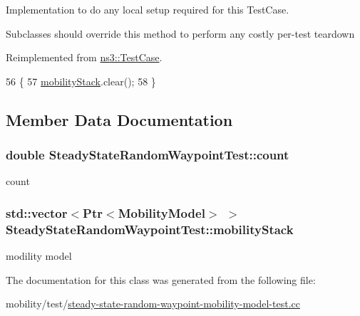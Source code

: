 Implementation to do any local setup required for this Test\+Case. 

Subclasses should override this method to perform any costly per-\/test teardown 

Reimplemented from \hyperlink{classns3_1_1TestCase_a8917f1604e28d312a8086f76291e3c46}{ns3\+::\+Test\+Case}.


\begin{DoxyCode}
56 \{
57   \hyperlink{classSteadyStateRandomWaypointTest_a492bad1d2d921f57ea65e92e12dc3d8a}{mobilityStack}.clear();
58 \}
\end{DoxyCode}


\subsection{Member Data Documentation}
\subsubsection[{\texorpdfstring{count}{count}}]{\setlength{\rightskip}{0pt plus 5cm}double Steady\+State\+Random\+Waypoint\+Test\+::count\hspace{0.3cm}{\ttfamily [private]}}\hypertarget{classSteadyStateRandomWaypointTest_a48ac9d867be62c0407cbf2e8c3ad5e1b}{}\label{classSteadyStateRandomWaypointTest_a48ac9d867be62c0407cbf2e8c3ad5e1b}


count 

\subsubsection[{\texorpdfstring{mobility\+Stack}{mobilityStack}}]{\setlength{\rightskip}{0pt plus 5cm}std\+::vector$<${\bf Ptr}$<${\bf Mobility\+Model}$>$ $>$ Steady\+State\+Random\+Waypoint\+Test\+::mobility\+Stack\hspace{0.3cm}{\ttfamily [private]}}\hypertarget{classSteadyStateRandomWaypointTest_a492bad1d2d921f57ea65e92e12dc3d8a}{}\label{classSteadyStateRandomWaypointTest_a492bad1d2d921f57ea65e92e12dc3d8a}


modility model 



The documentation for this class was generated from the following file\+:\begin{DoxyCompactItemize}
\item 
mobility/test/\hyperlink{steady-state-random-waypoint-mobility-model-test_8cc}{steady-\/state-\/random-\/waypoint-\/mobility-\/model-\/test.\+cc}\end{DoxyCompactItemize}
